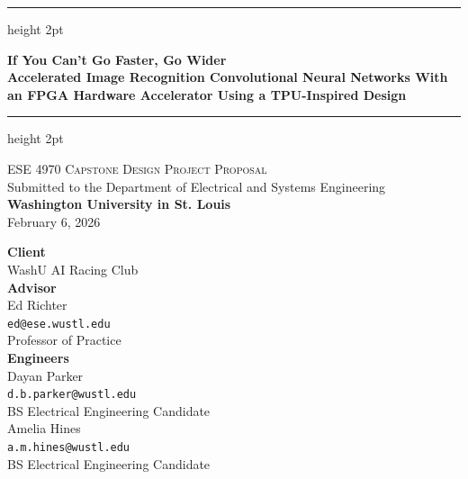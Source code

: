 \documentclass[11pt,a4paper,twoside]{article}
\begin{document}
\begin{titlepage}
    \centering
    
    \vspace*{1cm}
    \hrule height 2pt
    \vspace{0.8cm}
    
    {\Huge \textbf{If You Can't Go Faster, Go Wider}} \\[0.5cm]
    
    {\Large \textbf{Accelerated Image Recognition Convolutional Neural Networks With an FPGA Hardware Accelerator Using a TPU-Inspired Design}}
    
    \vspace{0.8cm}
    \hrule height 2pt
    
    \vspace{2.5cm}
    {\Large \textsc{ESE 4970 Capstone Design Project Proposal}} \\[0.5cm]
    Submitted to the Department of Electrical and Systems Engineering \\[0.2cm]
    \textbf{Washington University in St. Louis} \\[1cm]
    February 6, 2026
    
    \vfill
    
    
    \textbf{\large Client} \\
    WashU AI Racing Club \\[0.8cm]
    
    \textbf{\large Advisor} \\
    Ed Richter \\
    \texttt{ed@ese.wustl.edu} \\
    Professor of Practice \\[0.8cm]
    
    \textbf{\large Engineers} \\
    Dayan Parker \\
    \texttt{d.b.parker@wustl.edu} \\
    BS Electrical Engineering Candidate \\[0.4cm]
    
    Amelia Hines \\
    \texttt{a.m.hines@wustl.edu} \\
    BS Electrical Engineering Candidate
    
    \vspace{2cm}

\end{titlepage}
\end{document}

